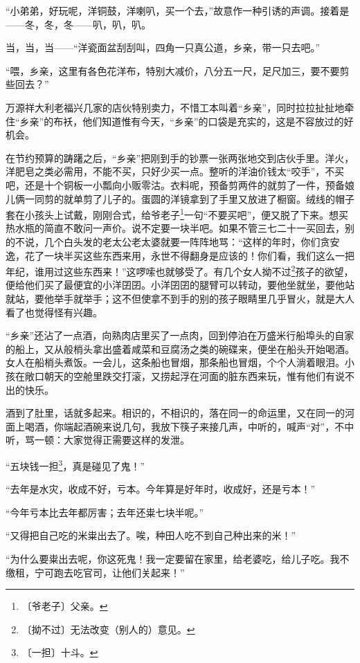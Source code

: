 \documentclass[12pt,UTF-8,openany]{ctexbook}
\begin{document}
\begin{normalsize}
    “小弟弟，好玩呢，洋铜鼓，洋喇叭，买一个去，”故意作一种引诱的声调。接着是——冬，冬，冬——叭，叭，叭。
    
    当，当，当——“洋瓷面盆刮刮叫，四角一只真公道，乡亲，带一只去吧。”
    
    “喂，乡亲，这里有各色花洋布，特别大减价，八分五一尺，足尺加三，要不要剪些回去？”
    
    万源祥大利老福兴几家的店伙特别卖力，不惜工本叫着“乡亲”，同时拉拉扯扯地牵住“乡亲”的布袄，他们知道惟有今天，“乡亲”的口袋是充实的，这是不容放过的好机会。
    
    在节约预算的踌躇之后，“乡亲”把刚到手的钞票一张两张地交到店伙手里。洋火，洋肥皂之类必需用，不能不买，只好少买一点。整听的洋油价钱太“咬手”，不买吧，还是十个铜板一小瓢向小贩零沽。衣料呢，预备剪两件的就剪了一件，预备娘儿俩一同剪的就单剪了儿子的。蛋圆的洋镜拿到了手里又放进了橱窗。绒线的帽子套在小孩头上试戴，刚刚合式，给爷老子\footnote{〔爷老子〕父亲。}一句“不要买吧”，便又脱了下来。想买热水瓶的简直不敢问一声价。说不定要一块半吧。如果不管三七二十一买回去，别的不说，几个白头发的老太公老太婆就要一阵阵地骂：“这样的年时，你们贪安逸，花了一块半买这些东西来用，永世不得翻身是应该的！你们看，我们这么一把年纪，谁用过这些东西来！”这啰嗦也就够受了。有几个女人拗不过\footnote{〔拗不过〕无法改变（别人的）意见。}孩子的欲望，便给他们买了最便宜的小洋囝囝。小洋囝囝的腿臂可以转动，要他坐就坐，要他站就站，要他举手就举手；这不但使拿不到手的别的孩子眼睛里几乎冒火，就是大人看了也觉得怪有兴趣。
    
    “乡亲”还沾了一点酒，向熟肉店里买了一点肉，回到停泊在万盛米行船埠头的自家的船上，又从般梢头拿出盛着咸菜和豆腐汤之类的碗碟来，便坐在船头开始喝酒。女人在船梢头煮饭。一会儿，这条船也冒烟，那条船也冒烟，个个人淌着眼泪。小孩在敞口朝天的空舱里跌交打滚，又捞起浮在河面的脏东西来玩，惟有他们有说不出的快乐。
    
    酒到了肚里，话就多起来。相识的，不相识的，落在同一的命运里，又在同一的河面上喝酒，你端起酒碗来说几句，我放下筷子来接几声，中听的，喊声“对”，不中听，骂一顿：大家觉得正需要这样的发泄。
    
    “五块钱一担\footnote{〔一担〕十斗。}，真是碰见了鬼！”
    
    “去年是水灾，收成不好，亏本。今年算是好年时，收成好，还是亏本！”
    
    “今年亏本比去年都厉害；去年还粜七块半呢。”
    
    “又得把自己吃的米粜出去了。唉，种田人吃不到自己种出来的米！”
    
    “为什么要粜出去呢，你这死鬼！我一定要留在家里，给老婆吃，给儿子吃。我不缴租，宁可跑去吃官司，让他们关起来！”
    

\end{normalsize}
\end{document}
